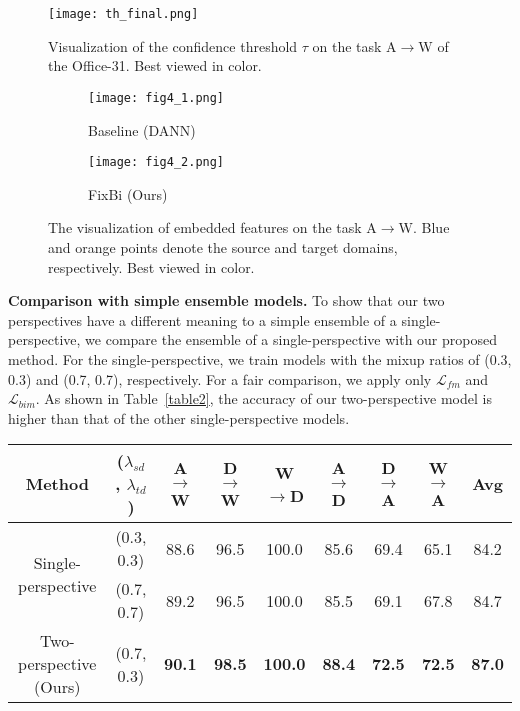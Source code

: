 \documentclass[final]{cvpr}
\begin{document}
\begin{figure}[t]
\hspace{-3.0mm}
\centering
\texttt{[image: th\_final.png]}
\caption{Visualization of the confidence threshold $\tau$ on the task A$\rightarrow$W of the Office-31. Best viewed in color.}
\label{fig:04}
\end{figure}

\begin{figure}[t]
    \hspace{1.5mm}
    \centering
    \begin{subfigure}[b]{0.45\columnwidth}
        \texttt{[image: fig4\_1.png]}
        \caption{Baseline (DANN)}
        \label{fig:05_1}
    \end{subfigure}
    \begin{subfigure}[b]{0.45\columnwidth}
        \texttt{[image: fig4\_2.png]}
        \caption{FixBi (Ours)}
        \label{fig:05_2}
    \end{subfigure}
    \vspace{1.5mm}
    \caption{The visualization of embedded features on the task A$\rightarrow$W. Blue and orange points denote the source and target domains, respectively. Best viewed in color.}
    \label{fig:05}
\end{figure}

\textbf{Comparison with simple ensemble models.} To show that our two perspectives have a different meaning to a simple ensemble of a single-perspective, we compare the ensemble of a single-perspective with our proposed method. For the single-perspective, we train models with the mixup ratios of (0.3, 0.3) and (0.7, 0.7), respectively. For a fair comparison, we apply only $\mathcal{L}_{fm}$ and $\mathcal{L}_{bim}$. As shown in Table~\ref{table2}, the accuracy of our two-perspective model is higher than that of the other single-perspective models.

\begin{table*}[t]
\centering
\caption{Comparison of ensemble networks on Office-31.}
\label{table2}
\begin{tabular}{c|c|c|c|c|c|c|c|c}
\hline
      Method   & ($\lambda_{sd}$, $\lambda_{td}$) & A$\rightarrow$W & D$\rightarrow$W & W$\rightarrow$D & A$\rightarrow$D & D$\rightarrow$A & W$\rightarrow$A & Avg           \\ \hline \hline
\multirow{2}{*}{Single-perspective} & (0.3, 0.3) & 88.6 & 96.5 &100.0 & 85.6 & 69.4 & 65.1 & 84.2 \\ 
\cline{2-9}
                   & (0.7, 0.7) & 89.2 & 96.5 &100.0 & 85.5 & 69.1 & 67.8 & 84.7 \\ \hline
Two-perspective (Ours) & (0.7, 0.3)                       & \textbf{90.1}   & \textbf{98.5}   & \textbf{100.0} & \textbf{88.4}   & \textbf{72.5}   & \textbf{72.5}   & \textbf{87.0} \\ \hline
\end{tabular}
\end{table*}
\end{document}
